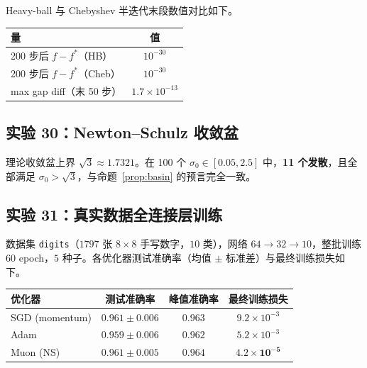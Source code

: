 \noindent Heavy-ball 与 Chebyshev 半迭代末段数值对比如下。
\begin{center}
  \vspace{0.5em}
  \begin{tabular}{@{}lc@{}}
    \toprule
    量 & 值 \\
    \midrule
    200 步后 $f - f^*$（HB）   & $10^{-30}$ \\
    200 步后 $f - f^*$（Cheb） & $10^{-30}$ \\
    max gap diff（末 50 步）   & $1.7 \times 10^{-13}$ \\
    \bottomrule
  \end{tabular}
  \vspace{0.5em}
\end{center}

\subsection{实验 30：Newton--Schulz 收敛盆}
\label{app:exp30}

\noindent 理论收敛盆上界 $\sqrt{3} \approx 1.7321$。在 100 个 $\sigma_0 \in [0.05, 2.5]$ 中，\textbf{11 个发散}，且全部满足 $\sigma_0 > \sqrt{3}$，与命题~\ref{prop:basin} 的预言完全一致。

\subsection{实验 31：真实数据全连接层训练}
\label{app:exp31}

\noindent 数据集 \texttt{digits}（$1797$ 张 $8\times 8$ 手写数字，$10$ 类），网络 $64\!\to\!32\!\to\!10$，整批训练 $60$ epoch，$5$ 种子。各优化器测试准确率（均值 $\pm$ 标准差）与最终训练损失如下。
\begin{center}
  \vspace{0.5em}
  \begin{tabular}{@{}lccc@{}}
    \toprule
    优化器 & 测试准确率 & 峰值准确率 & 最终训练损失 \\
    \midrule
    SGD (momentum) & $0.961 \pm 0.006$ & $0.963$ & $9.2\times 10^{-3}$ \\
    Adam           & $0.959 \pm 0.006$ & $0.962$ & $5.2\times 10^{-3}$ \\
    Muon (NS)      & $0.961 \pm 0.005$ & $\mathbf{0.964}$ & $\mathbf{4.2\times 10^{-5}}$ \\
    \bottomrule
  \end{tabular}
  \vspace{0.5em}
\end{center}

